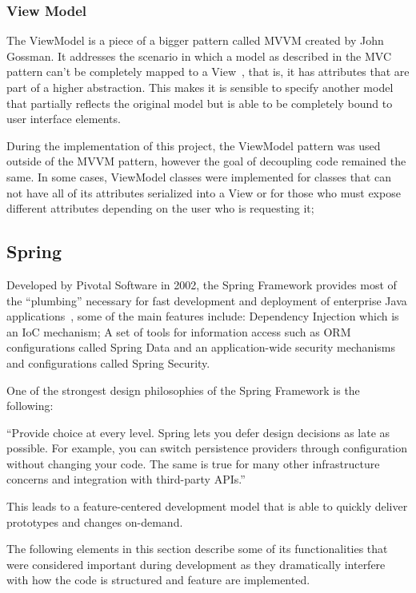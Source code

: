 \subsubsection{View Model}
The ViewModel is a piece of a bigger pattern called \gls{MVVM} created by John Gossman. It addresses the scenario in which a model as described in the \gls{MVC} pattern can't be completely mapped to a View~\cite{viewmodel}, that is, it has attributes that are part of a higher abstraction. This makes it is sensible to specify another model that partially reflects the original model but is able to be completely bound to user interface elements.

During the implementation of this project, the ViewModel pattern was used outside of the \gls{MVVM} pattern, however the goal of decoupling code remained the same. In some cases, ViewModel classes were implemented for classes that can not have all of its attributes serialized into a View or for those who must expose different attributes depending on the user who is requesting it; 

\subsection{Spring}\label{concept:spring}
Developed by Pivotal Software in 2002, the Spring Framework provides most of the ``plumbing'' necessary for fast development and deployment of enterprise Java applications~\cite{springdocs}, some of the main features include: Dependency Injection which is an \gls{IoC} mechanism; A set of tools for information access such as \gls{ORM} configurations called Spring Data and an application-wide security mechanisms and configurations called Spring Security.

One of the strongest design philosophies of the Spring Framework is the following:

\begin{displayquote}
``Provide choice at every level. Spring lets you defer design decisions as late as possible. For example, you can switch persistence providers through configuration without changing your code. The same is true for many other infrastructure concerns and integration with third-party \gls{API}s.''~\textcite{springdocs}
\end{displayquote}
This leads to a feature-centered development model that is able to quickly deliver prototypes and changes on-demand.

The following elements in this section describe some of its functionalities that were considered important during development as they dramatically interfere with how the code is structured and feature are implemented.

